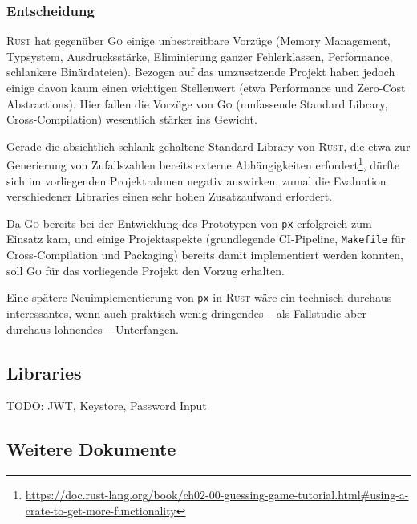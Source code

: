 \subsubsection{Entscheidung}
\label{sec:decision-programming-language}

\textsc{Rust} hat gegenüber \textsc{Go} einige unbestreitbare Vorzüge (Memory Management, Typsystem, Ausdrucksstärke, Eliminierung ganzer Fehlerklassen, Performance, schlankere Binärdateien). Bezogen auf das umzusetzende Projekt haben jedoch einige davon kaum einen wichtigen Stellenwert (etwa Performance und Zero-Cost Abstractions). Hier fallen die Vorzüge von \textsc{Go} (umfassende Standard Library, Cross-Compilation) wesentlich stärker ins Gewicht.

Gerade die absichtlich schlank gehaltene Standard Library von \textsc{Rust}, die etwa zur Generierung von Zufallszahlen bereits externe Abhängigkeiten erfordert\footnote{\url{https://doc.rust-lang.org/book/ch02-00-guessing-game-tutorial.html\#using-a-crate-to-get-more-functionality}}, dürfte sich im vorliegenden Projektrahmen negativ auswirken, zumal die Evaluation verschiedener Libraries einen sehr hohen Zusatzaufwand erfordert.

Da \textsc{Go} bereits bei der Entwicklung des Prototypen von \texttt{px} erfolgreich zum Einsatz kam, und einige Projektaspekte (grundlegende CI-Pipeline, \texttt{Makefile} für Cross-Compilation und Packaging) bereits damit implementiert werden konnten, soll \textsc{Go} für das vorliegende Projekt den Vorzug erhalten.

Eine spätere Neuimplementierung von \texttt{px} in \textsc{Rust} wäre ein technisch durchaus interessantes, wenn auch praktisch wenig dringendes ‒ als Fallstudie aber durchaus lohnendes ‒ Unterfangen.

\subsection{Libraries}

TODO: JWT, Keystore, Password Input

\subsection{Weitere Dokumente}
\label{apx:WeitereDokumente}

